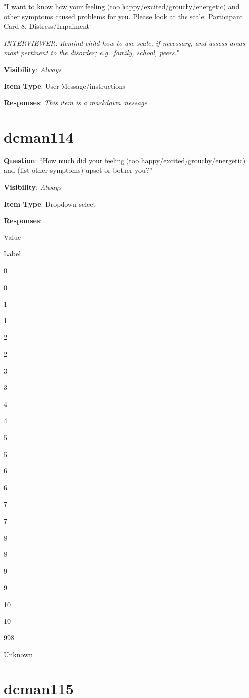 \documentclass[]{book}
\begin{document}
"I want to know how your feeling (too happy/excited/grouchy/energetic) and other symptoms caused problems for you. Please look at the scale: Participant Card 8, Distress/Impaiment

\emph{INTERVIEWER: Remind child how to use scale, if necessary, and assess areas most pertinent to the disorder; e.g.~family, school, peers.}"

\textbf{Visibility}: \emph{Always}

\textbf{Item Type}: User Message/instructions

\textbf{Responses}: \emph{This item is a markdown message}

\hypertarget{dcman114}{%
\section{dcman114}\label{dcman114}}

\textbf{Question}: ``How much did your feeling (too happy/excited/grouchy/energetic) and (list other symptoms) upset or bother you?''

\textbf{Visibility}: \emph{Always}

\textbf{Item Type}: Dropdown select

\textbf{Responses}:

Value

Label

0

0

1

1

2

2

3

3

4

4

5

5

6

6

7

7

8

8

9

9

10

10

998

Unknown

\hypertarget{dcman115}{%
\section{dcman115}\label{dcman115}}
\end{document}
